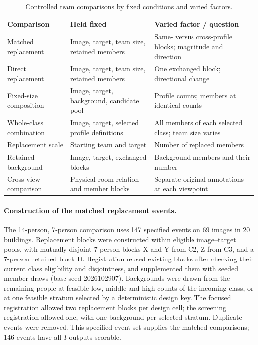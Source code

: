 \begin{table}[ht]
\centering\small
\caption{Controlled team comparisons by fixed conditions and varied factors.}
\label{tab:comparison-designs}
\setlength{\tabcolsep}{5pt}\renewcommand{\arraystretch}{1.13}
\begin{tabular}{@{}p{}p{}p{}@{}}
\hline
Comparison & Held fixed & Varied factor / question\\\hline
Matched replacement & Image, target, team size, retained members & Same- versus cross-profile blocks; magnitude and direction\\
Direct replacement & Image, target, team size, retained members & One exchanged block; directional change\\
Fixed-size composition & Image, target, background, candidate pool & Profile counts; members at identical counts\\
Whole-class combination & Image, target, selected profile definitions & All members of each selected class; team size varies\\
Replacement scale & Starting team and target & Number of replaced members\\
Retained background & Image, target, exchanged blocks & Background members and their number\\
Cross-view comparison & Physical-room relation and member blocks & Separate original annotations at each viewpoint\\\hline
\end{tabular}
\end{table}

\paragraph{Construction of the matched replacement events.}
The 14-person, 7-person comparison uses 147 specified events on 69 images in 20 buildings. Replacement blocks were constructed within eligible image--target pools, with mutually disjoint 7-person blocks X and Y from C2, Z from C3, and a 7-person retained block D. Registration reused existing blocks after checking their current class eligibility and disjointness, and supplemented them with seeded member draws (base seed 2026102907). Backgrounds were drawn from the remaining people at feasible low, middle and high counts of the incoming class, or at one feasible stratum selected by a deterministic design key. The focused registration allowed two replacement blocks per design cell; the screening registration allowed one, with one background per selected stratum. Duplicate events were removed. This specified event set supplies the matched comparisons; 146 events have all 3 outputs scorable.

